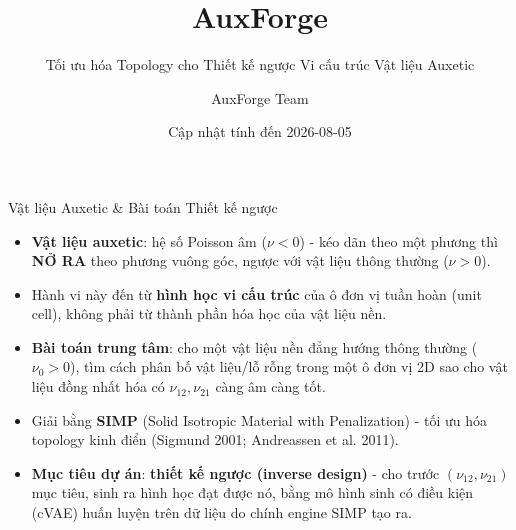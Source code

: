 \documentclass[aspectratio=169,11pt]{beamer}
\title[AuxForge]{AuxForge}
\subtitle{Tối ưu hóa Topology cho Thiết kế ngược Vi cấu trúc Vật liệu Auxetic}
\author{AuxForge Team}
\institute{Phiên bản \texttt{v1.4.0} - nhánh \texttt{main}}
\date{Cập nhật tính đến 2026-08-05}
\begin{document}
\begin{frame}
  \titlepage
\end{frame}

\begin{frame}{Vật liệu Auxetic \& Bài toán Thiết kế ngược}
  \begin{itemize}
    \item \textbf{Vật liệu auxetic}: hệ số Poisson âm ($\nu<0$) - kéo dãn theo một phương thì \textbf{NỞ RA} theo phương vuông góc, ngược với vật liệu thông thường ($\nu>0$).
    \item Hành vi này đến từ \textbf{hình học vi cấu trúc} của ô đơn vị tuần hoàn (unit cell), không phải từ thành phần hóa học của vật liệu nền.
    \item \textbf{Bài toán trung tâm}: cho một vật liệu nền đẳng hướng thông thường ($\nu_0>0$), tìm cách phân bố vật liệu/lỗ rỗng trong một ô đơn vị 2D sao cho vật liệu đồng nhất hóa có $\nu_{12}, \nu_{21}$ càng âm càng tốt.
    \item Giải bằng \textbf{SIMP} (Solid Isotropic Material with Penalization) - tối ưu hóa topology kinh điển (Sigmund 2001; Andreassen et al. 2011).
    \item \textbf{Mục tiêu dự án}: \textbf{thiết kế ngược (inverse design)} - cho trước $(\nu_{12},\nu_{21})$ mục tiêu, sinh ra hình học đạt được nó, bằng mô hình sinh có điều kiện (cVAE) huấn luyện trên dữ liệu do chính engine SIMP tạo ra.
  \end{itemize}
\end{frame}
\end{document}
